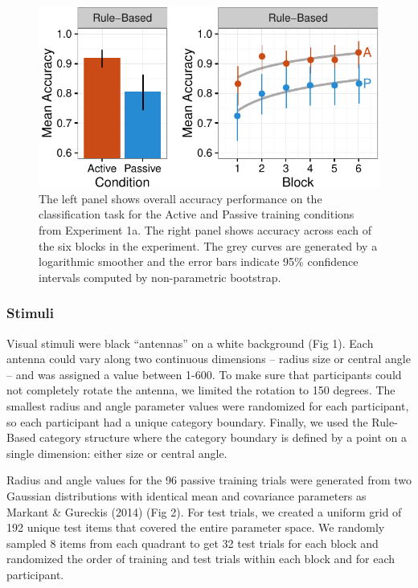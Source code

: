 \documentclass[10pt, letterpaper]{article}
\newenvironment{CodeChunk}{}{}
\begin{document}
\begin{CodeChunk}
\begin{figure}[t]

{\centering \includegraphics{figs/exp1a_acc_plot-1} 

}

\caption[The left panel shows overall accuracy performance on the classification task for the Active and Passive training conditions from Experiment 1a]{The left panel shows overall accuracy performance on the classification task for the Active and Passive training conditions from Experiment 1a. The right panel shows accuracy across each of the six blocks in the experiment. The grey curves are generated by a logarithmic smoother and the error bars indicate 95\% confidence intervals computed by non-parametric bootstrap.}\label{fig:exp1a_acc_plot}
\end{figure}
\end{CodeChunk}

\subsubsection{Stimuli}\label{stimuli}

Visual stimuli were black ``antennas'' on a white background (Fig 1).
Each antenna could vary along two continuous dimensions -- radius size
or central angle -- and was assigned a value between 1-600. To make sure
that participants could not completely rotate the antenna, we limited
the rotation to 150 degrees. The smallest radius and angle parameter
values were randomized for each participant, so each participant had a
unique category boundary. Finally, we used the Rule-Based category
structure where the category boundary is defined by a point on a single
dimension: either size or central angle.

Radius and angle values for the 96 passive training trials were
generated from two Gaussian distributions with identical mean and
covariance parameters as Markant \& Gureckis (2014) (Fig 2). For test
trials, we created a uniform grid of 192 unique test items that covered
the entire parameter space. We randomly sampled 8 items from each
quadrant to get 32 test trials for each block and randomized the order
of training and test trials within each block and for each participant.
\end{document}
